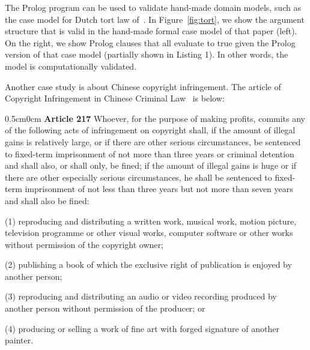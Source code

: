 \documentclass{IOS-Book-Article}
\begin{document}
The Prolog program can be used to validate hand-made domain models, such as the case model for Dutch tort law of~\cite{Verheij2017Formalizing}. In Figure~\ref{fig:tort}, we show the argument structure that is valid in the hand-made formal case model of that paper (left). On the right, we show Prolog clauses that all evaluate to true given the Prolog version of that case model (partially shown in Listing 1). In other words, the model is computationally validated.
\newline

\begin{figure*}[btp]
	\scalebox{0.6}{}
\caption{The Dutch tort law model: argument structure (left); in Prolog (right)}
\label{fig:tort}
\end{figure*}


\noindent Another case study is about Chinese copyright infringement. The article of Copyright Infringement in Chinese Criminal Law~\cite{NPC1997CCL} is below:
\newline

\footnotesize
\begin{adjustwidth}{0.5cm}{0cm}
\noindent \textbf{Article 217} Whoever, for the purpose of making profits, commits any of the following acts of infringement on copyright shall, if the amount of illegal gains is relatively large, or if there are other serious circumstances, be sentenced to fixed-term imprisonment of not more than three years or criminal detention and shall also, or shall only, be fined; if the amount of illegal gains is huge or if there are other especially serious circumstances, he shall be sentenced to fixed-term imprisonment of not less than three years but not more than seven years and shall also be fined:

\noindent (1) reproducing and distributing a written work, musical work, motion picture, television programme or other visual works, computer software or other works without permission of the copyright owner;

\noindent (2) publishing a book of which the exclusive right of publication is enjoyed by another person;

\noindent (3) reproducing and distributing an audio or video recording produced by another person without permission of the producer; or

\noindent (4) producing or selling a work of fine art with forged signature of another painter.\newline
\end{adjustwidth}
\end{document}
